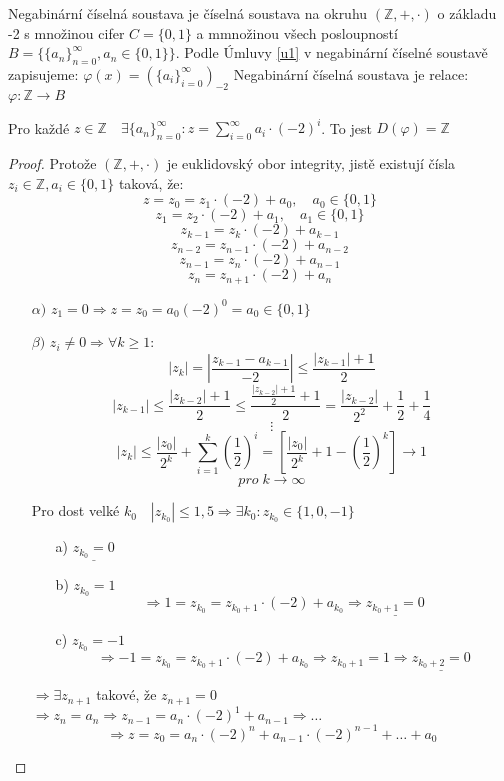 \documentclass[czech,bachelor,dept470,male]{diploma}
\newcommand{\posla}{\{a_i\}_{i=0}^{\infty}}
\begin{document}
\begin{definition}
	Negabinární číselná soustava je číselná soustava na okruhu $(\mathbb{Z},+,\cdot)$ o základu -2 s množinou cifer $C=\{0,1\}$ a mmnožinou všech posloupností
	$B=\{\{a_n\}_{n=0}^\infty,a_n \in \{0,1\} \}$.\newline
	Podle Úmluvy \ref{u1} v negabinární číselné soustavě zapisujeme:
	$\varphi(x) = (\posla)_{-2}$\newline
	Negabinární číselná soustava je relace:
	$\varphi:\mathbb{Z}\to B$
\end{definition}
\begin{theorem}
	Pro každé $z \in \mathbb{Z} \quad \exists\{a_n\}_{n=0}^\infty:z=\sum_{i=0}^{\infty}a_i\cdot(-2)^i$. To jest $D(\varphi)=\mathbb{Z}$
\end{theorem}
\begin{proof}\label{negaDF}
	Protože $(\mathbb{Z},+,\cdot)$ je euklidovský obor integrity, jistě existují čísla $z_i\in\mathbb{Z}, a_i\in\{0,1\}$ taková, že:
	$$ z=z_0=z_1\cdot(-2)+a_0,\quad a_0\in\{0,1\}$$
	$$ z_1=z_2\cdot(-2)+a_1,\quad a_1\in\{0,1\}$$
	$$ z_{k-1}=z_k\cdot(-2)+a_{k-1}$$
	$$ z_{n-2}=z_{n-1}\cdot(-2)+a_{n-2}$$
	$$ z_{n-1}=z_n\cdot(-2)+a_{n-1}$$
	$$ z_n=z_{n+1}\cdot(-2)+a_n$$
	\begin{enumerate}
		\item[$\alpha)$] $z_1=0 \Rightarrow z=z_0=a_0(-2)^0=a_0\in\{0,1\}$
		\item[$\beta)$]  $z_i \ne 0 \Rightarrow \forall k \ge 1:$
		$$|z_k|=\left|\frac{z_{k-1}-a_{k-1}}{-2}\right|\le \frac{|z_{k-1}|+1}{2}$$
		$$|z_{k-1}|\le\frac{|z_{k-2}|+1}{2}\le\frac{\frac{|z_{k-2}|+1}{2}+1}{2}=\frac{|z_{k-2}|}{2^2}+\frac{1}{2}+\frac{1}{4}$$
		$$\vdots$$
		$$|z_k|\le\frac{|z_0|}{2^k}+\sum_{i=1}^{k}\left(\frac{1}{2}\right)^i=\left[\frac{|z_0|}{2^k}+1-\left(\frac{1}{2}\right)^k \right]\to 1 $$
		$$ pro\; k \to \infty $$
		
		Pro dost velké $k_0 \quad |z_{k_0}|\le1,5 \Rightarrow \exists k_0:z_{k_0}\in\{1,0,-1\}$
		\begin{enumerate}
			\item[a)] $\underline{z_{k_0}=0}$
			\item[b)]$z_{k_0}=1$
			$$\Rightarrow 1=z_{k_0}=z_{k_0+1}\cdot(-2)+a_{k_0}\Rightarrow \underline{z_{k_0+1}=0}$$
			\item[c)]$z_{k_0}=-1$
			$$\Rightarrow -1=z_{k_0}=z_{k_0+1}\cdot(-2)+a_{k_0}\Rightarrow z_{k_0+1}=1\Rightarrow \underline{z_{k_0+2}=0}$$ 
		\end{enumerate}
		$\Rightarrow \exists z_{n+1}$ takové, že $z_{n+1}=0$\newline
		$\Rightarrow z_n = a_n \Rightarrow z_{n-1}=a_n\cdot(-2)^1+a_{n-1}\Rightarrow \dots$
		$$\Rightarrow z=z_0=a_n\cdot(-2)^n+a_{n-1}\cdot(-2)^{n-1}+\dots+a_0$$
	\end{enumerate}
\end{proof}
\end{document}
